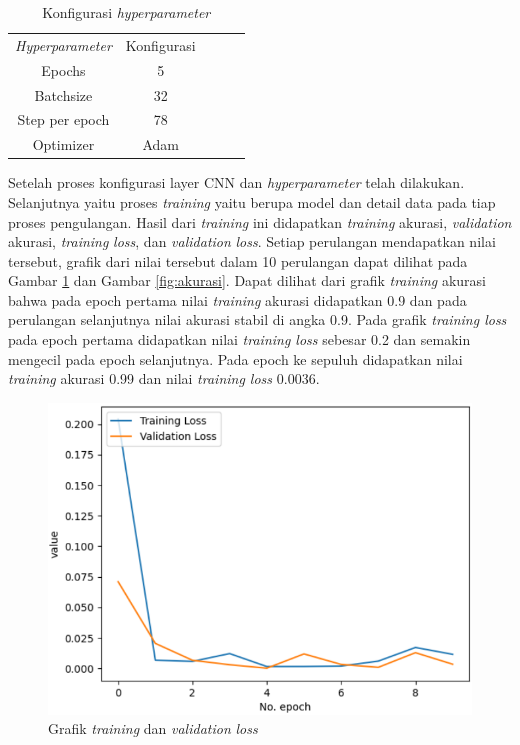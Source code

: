\begin{table}[H]
  \centering
  \caption{Konfigurasi \emph{hyperparameter}}
  \label{fig:hyperparameter}
  \begin{tabular}{|c|c|lll}
  \cline{1-2}
  \emph{Hyperparameter} & Konfigurasi \\ \cline{1-2}
  Epochs         & 5 \\ \cline{1-2}
  Batchsize      & 32 \\ \cline{1-2}
  Step per epoch      & 78 \\ \cline{1-2}
  Optimizer      & Adam \\ \cline{1-2}
  \end{tabular}
\end{table}

Setelah proses konfigurasi layer CNN dan \emph{hyperparameter} telah dilakukan. Selanjutnya yaitu proses \emph{training} yaitu berupa model dan detail data pada tiap proses pengulangan. Hasil dari \emph{training} ini didapatkan \emph{training} akurasi, \emph{validation} akurasi, \emph{training} \emph{loss}, dan \emph{validation} \emph{loss}. Setiap perulangan mendapatkan nilai tersebut, grafik dari nilai tersebut dalam 10 perulangan dapat dilihat pada Gambar \ref*{fig:loss} dan Gambar \ref*{fig:akurasi}. Dapat dilihat dari grafik \emph{training} akurasi bahwa pada epoch pertama nilai \emph{training} akurasi didapatkan 0.9 dan pada perulangan selanjutnya nilai akurasi stabil di angka 0.9. Pada grafik \emph{training loss} pada epoch pertama didapatkan nilai \emph{training loss} sebesar 0.2 dan semakin mengecil pada epoch selanjutnya. Pada epoch ke sepuluh didapatkan nilai \emph{training} akurasi 0.99 dan nilai \emph{training loss} 0.0036. 

\begin{figure}[H]
  \centering
  \includegraphics[width=0.64\linewidth]{../Gambar/loss.png}
  \caption{Grafik \emph{training} dan \emph{validation} \emph{loss}}
  \label{fig:loss}
\end{figure}

